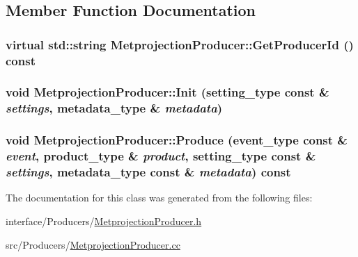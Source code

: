\subsection{Member Function Documentation}
\hypertarget{classMetprojectionProducer_a13ec4b981171fa067f4558679b99a9b0}{
\subsubsection[{GetProducerId}]{\setlength{\rightskip}{0pt plus 5cm}virtual std::string MetprojectionProducer::GetProducerId () const}}
\label{classMetprojectionProducer_a13ec4b981171fa067f4558679b99a9b0}
\hypertarget{classMetprojectionProducer_a0f529b8d43928e96e4a5f134b8becd95}{
\subsubsection[{Init}]{\setlength{\rightskip}{0pt plus 5cm}void MetprojectionProducer::Init (setting\_\-type const \& {\em settings}, \/  metadata\_\-type \& {\em metadata})}}
\label{classMetprojectionProducer_a0f529b8d43928e96e4a5f134b8becd95}
\hypertarget{classMetprojectionProducer_a6462da23d35e0c04c2b2c65fdfc1ff5f}{
\subsubsection[{Produce}]{\setlength{\rightskip}{0pt plus 5cm}void MetprojectionProducer::Produce (event\_\-type const \& {\em event}, \/  product\_\-type \& {\em product}, \/  setting\_\-type const \& {\em settings}, \/  metadata\_\-type const \& {\em metadata}) const}}
\label{classMetprojectionProducer_a6462da23d35e0c04c2b2c65fdfc1ff5f}


The documentation for this class was generated from the following files:\begin{DoxyCompactItemize}
\item 
interface/Producers/\hyperlink{MetprojectionProducer_8h}{MetprojectionProducer.h}\item 
src/Producers/\hyperlink{MetprojectionProducer_8cc}{MetprojectionProducer.cc}\end{DoxyCompactItemize}
